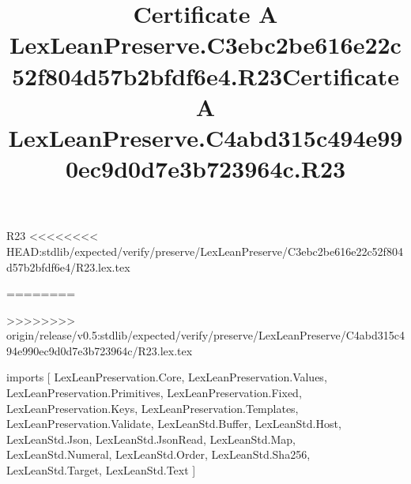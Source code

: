 \begin{lexlean}{R23}
<<<<<<<< HEAD:stdlib/expected/verify/preserve/LexLeanPreserve/C3ebc2be616e22c52f804d57b2bfdf6e4/R23.lex.tex
\title{Certificate A LexLeanPreserve.C3ebc2be616e22c52f804d57b2bfdf6e4.R23}
========
\title{Certificate A LexLeanPreserve.C4abd315c494e990ec9d0d7e3b723964c.R23}
>>>>>>>> origin/release/v0.5:stdlib/expected/verify/preserve/LexLeanPreserve/C4abd315c494e990ec9d0d7e3b723964c/R23.lex.tex
\begin{coremodule}
imports [
  LexLeanPreservation.Core,
  LexLeanPreservation.Values,
  LexLeanPreservation.Primitives,
  LexLeanPreservation.Fixed,
  LexLeanPreservation.Keys,
  LexLeanPreservation.Templates,
  LexLeanPreservation.Validate,
  LexLeanStd.Buffer,
  LexLeanStd.Host,
  LexLeanStd.Json,
  LexLeanStd.JsonRead,
  LexLeanStd.Map,
  LexLeanStd.Numeral,
  LexLeanStd.Order,
  LexLeanStd.Sha256,
  LexLeanStd.Target,
  LexLeanStd.Text
]


\end{coremodule}
\end{lexlean}

